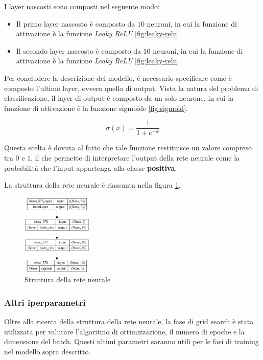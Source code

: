 I layer nascosti sono composti nel seguente modo:
\begin{itemize}
    \item Il primo layer nascosto è composto da $10$ neuroni, in cui la funzione di
          attivazione è la funzione \textit{Leaky ReLU} \ref{fig:leaky-relu}.
    \item Il secondo layer nascosto è composto da $10$ neuroni, in cui la funzione
          di attivazione è la funzione \textit{Leaky ReLU} \ref{fig:leaky-relu}.
\end{itemize}

Per concludere la descrizione del modello, è necessario specificare come è composto
l'ultimo layer, ovvero quello di output. Vista la natura del problema di classificazione,
il layer di output è composto da un solo neurone, in cui la funzione di attivazione
è la funzione sigmoide \ref{fig:sigmoid}.

\begin{equation}
    \sigma(x) = \frac{1}{1 + e^{-x}}
\end{equation}

Questa scelta è dovuta al fatto che tale funzione restituisce un valore compreso
tra $0$ e $1$, il che permette di interpretare l'output della rete neurale come la
probabilità che l'input appartenga alla classe \textbf{positiva}.

La struttura della rete neurale è riassunta nella figura \ref{fig:strutturaReteNeurale}.

\begin{figure}[!ht]
    \centering
    \includegraphics[width=0.3\textwidth]{img/rete/struttura_rete.png}
    \caption{Struttura della rete neurale}
    \label{fig:strutturaReteNeurale}
\end{figure}

\subsubsection{Altri iperparametri}
Oltre alla ricerca della struttura della rete neurale, la fase di grid search è
stata utilizzata per valutare l'algoritmo di ottimizzazione, il numero di epoche
e la dimensione del batch. Questi ultimi parametri saranno utili per le fasi di training
nel modello sopra descritto.

